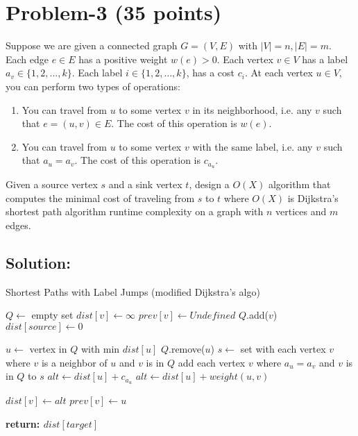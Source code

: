 \documentclass[11pt]{article}
\begin{document}
\newpage
\section*{Problem-3 (35 points)}
Suppose we are given a connected graph $G = (V, E)$ with $|V| = n, |E| = m$. Each edge $e \in E$ has a positive weight $w(e) > 0$. Each vertex $v \in V$ has a label $a_v \in \{1, 2, \ldots, k\}$. Each label $i \in \{1, 2, \ldots, k\}$, has a cost $c_i$. At each vertex $u \in V$, you can perform two types of operations:
\begin{enumerate}
    \item You can travel from $u$ to some vertex $v$ in its neighborhood, i.e. any $v$ such that $e = (u,v) \in E$. The cost of this operation is $w(e)$.
    \item You can travel from $u$ to some vertex $v$ with the same label, i.e. any $v$ such that $a_u = a_v$. The cost of this operation is $c_{a_u}$.
\end{enumerate}

Given a source vertex $s$ and a sink vertex $t$, design a $O(X)$ algorithm that computes the minimal cost of traveling from $s$ to $t$ where $O(X)$ is Dijkstra’s shortest path algorithm runtime complexity on a graph with $n$ vertices and $m$ edges.

\newpage
\subsection*{Solution:}

\begin{algorithm}
    \caption{Shortest Paths with Label Jumps (modified Dijkstra's algo)}
    \begin{algorithmic}[1]
        \STATE $Q \gets$ empty set
            \STATE $dist[v] \gets \infty$
            \STATE $prev[v] \gets Undefined$
            \STATE $Q$.add($v$)
        \ENDFOR
        \STATE $dist[source] \gets 0$
        \STATE
        
            \STATE $u \gets$ vertex in $Q$ with min $dist[u]$
            \STATE $Q$.remove($u$)
            \STATE
            \STATE $s \gets $ set with each vertex $v$ where $v$ is a neighbor of $u$ and $v$ is in $Q$
            \STATE add each vertex $v$ where $a_u = a_v$ and $v$ is in $Q$ to $s$
                    \STATE $alt \gets dist[u] + c_{a_u}$
                \ELSE
                    \STATE $alt \gets dist[u] + weight(u, v)$
                \ENDIF
                \STATE
                
                    \STATE $dist[v] \gets alt$
                    \STATE $prev[v] \gets u$
                \ENDIF
            \ENDFOR
        \ENDWHILE
        
        \STATE \textbf{return: $dist[target]$}
    \end{algorithmic}
\end{algorithm}
\end{document}
